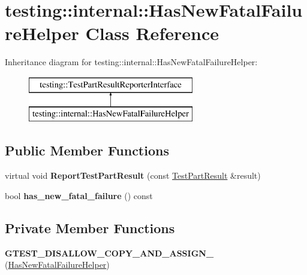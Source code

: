 \hypertarget{classtesting_1_1internal_1_1_has_new_fatal_failure_helper}{}\section{testing\+:\+:internal\+:\+:Has\+New\+Fatal\+Failure\+Helper Class Reference}
\label{classtesting_1_1internal_1_1_has_new_fatal_failure_helper}
Inheritance diagram for testing\+:\+:internal\+:\+:Has\+New\+Fatal\+Failure\+Helper\+:\begin{figure}[H]
\begin{center}
\leavevmode
\includegraphics[height=2.000000cm]{classtesting_1_1internal_1_1_has_new_fatal_failure_helper}
\end{center}
\end{figure}
\subsection*{Public Member Functions}
\begin{DoxyCompactItemize}
\item 
\mbox{\label{classtesting_1_1internal_1_1_has_new_fatal_failure_helper_ac7b5e77c9847b2b057cb97193ba82441}} 
virtual void {\bfseries Report\+Test\+Part\+Result} (const \hyperlink{classtesting_1_1_test_part_result}{Test\+Part\+Result} \&result)
\item 
\mbox{\label{classtesting_1_1internal_1_1_has_new_fatal_failure_helper_a91b7bac47f09076db4be0304a2110a9e}} 
bool {\bfseries has\+\_\+new\+\_\+fatal\+\_\+failure} () const
\end{DoxyCompactItemize}
\subsection*{Private Member Functions}
\begin{DoxyCompactItemize}
\item 
\mbox{\label{classtesting_1_1internal_1_1_has_new_fatal_failure_helper_a1412aefd53134f35ce1689f56c35a10d}} 
{\bfseries G\+T\+E\+S\+T\+\_\+\+D\+I\+S\+A\+L\+L\+O\+W\+\_\+\+C\+O\+P\+Y\+\_\+\+A\+N\+D\+\_\+\+A\+S\+S\+I\+G\+N\+\_\+} (\hyperlink{classtesting_1_1internal_1_1_has_new_fatal_failure_helper}{Has\+New\+Fatal\+Failure\+Helper})
\end{DoxyCompactItemize}
